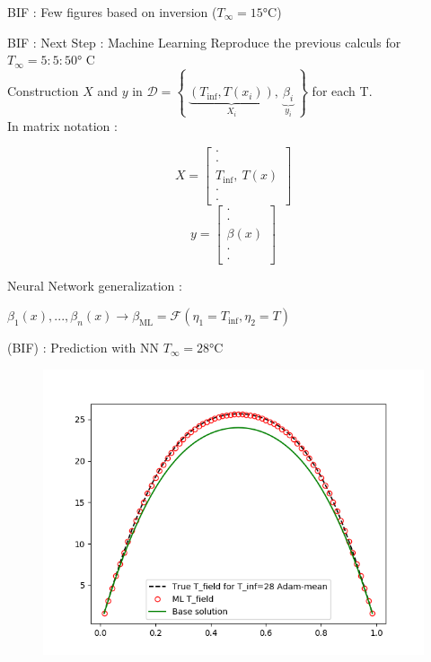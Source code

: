 \documentclass[10pt,
			   xcolor=svgnames,
			   hyperref={linkcolor=red, citecolor = DarkGreen, colorlinks=true, urlcolor=Navy}]{beamer}
\newcommand{\bepar}[1]{
	\left( #1 \right)  
}
\begin{document}
\begin{frame}{BIF : Few figures based on inversion ($T_\infty = \ang{15}$C)}
\begin{multicols}{2}
	
\end{multicols}
\end{frame}

\begin{frame}{BIF : Next Step : Machine Learning}
Reproduce the previous calculs for $T_\infty  = 5:5:\ang{50}$ C \\[5mm]

Construction $X$ and $y$ in $\mathcal{D} = \left\lbrace \ \underbrace{\bepar{T_{\text{inf}},T(x_i)}}_{X_i}, \ \underbrace{\beta_i}_{y_i}\ \right\rbrace$ for each T.\\
In matrix notation : 

\begin{multicols}{2}
\noindent
$$ X = \left[ \begin{array}{c} \cdot \\ \cdot \\ T_{\text{inf}},\ T(x) \\ \cdot \\ \cdot
			  \end{array}
	   \right]
$$
\columnbreak
$$ y = \left[ \begin{array}{c} \cdot \\ \cdot \\ \beta(x) \\ \cdot \\ \cdot
			  \end{array}
	   \right]
$$
\end{multicols}
Neural Network generalization : \\
\begin{center}
 $\beta_1(x), ..., \beta_n(x) \rightarrow \beta_{\text{ML}} = \mathcal{F}\bepar{\eta_1 = T_{\text{inf}}, \eta_2= T}$
\end{center}
\end{frame}

\begin{frame}{(BIF) : Prediction with NN }
$T_\infty = \ang{28}$C 
\begin{figure}[H]
	\centering
	\includegraphics[scale=0.5]{T_True_vs_T_ML_N_sample_5_T_inf_28_Adam-mean.png}
\end{figure}

\end{frame}
\end{document}
